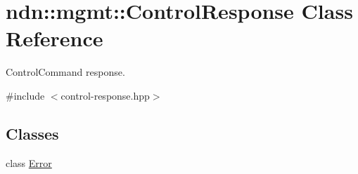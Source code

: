 \hypertarget{classndn_1_1mgmt_1_1ControlResponse}{}\section{ndn\+:\+:mgmt\+:\+:Control\+Response Class Reference}
\label{classndn_1_1mgmt_1_1ControlResponse}


Control\+Command response.  




{\ttfamily \#include $<$control-\/response.\+hpp$>$}

\subsection*{Classes}
\begin{DoxyCompactItemize}
\item 
class \hyperlink{classndn_1_1mgmt_1_1ControlResponse_1_1Error}{Error}
\end{DoxyCompactItemize}
